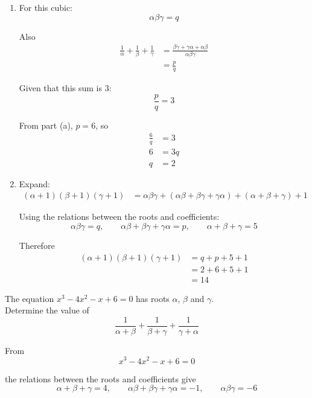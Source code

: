 \documentclass[leqno]{article}
\begin{document}
\begin{enumerate}[
  label=\textbf{\arabic*.},
  leftmargin=*,
  topsep=0pt,
  partopsep=0pt,
  parsep=0pt
]
\begin{djsSolution}
\begin{enumerate}[label=\textbf{(\alph*)}]
  \item For this cubic:
  \[
  \alpha\beta\gamma=q
  \]

  Also
  \begin{align*}
  \frac{1}{\alpha}+\frac{1}{\beta}+\frac{1}{\gamma}
  &=\frac{\beta\gamma+\gamma\alpha+\alpha\beta}{\alpha\beta\gamma} \\
  &=\frac{p}{q}
  \end{align*}

  Given that this sum is \(3\):
  \[
  \frac{p}{q}=3
  \]

  From part (a), $p=6$, so
  \begin{align*}
  \frac{6}{q}&=3 \\
  6&=3q \\
  q&=2
  \end{align*}

  \item Expand:
  \begin{align*}
  (\alpha+1)(\beta+1)(\gamma+1)
  &=\alpha\beta\gamma+(\alpha\beta+\beta\gamma+\gamma\alpha)+(\alpha+\beta+\gamma)+1
  \end{align*}

  Using the relations between the roots and coefficients:
  \[
  \alpha\beta\gamma=q,\qquad
  \alpha\beta+\beta\gamma+\gamma\alpha=p,\qquad
  \alpha+\beta+\gamma=5
  \]

  Therefore
  \begin{align*}
  (\alpha+1)(\beta+1)(\gamma+1)
  &=q+p+5+1 \\
  &=2+6+5+1 \\
  &=14
  \end{align*}
\end{enumerate}
\end{djsSolution}


\newpage

\questionitem

The equation $x^3 - 4x^2 - x + 6 = 0$ has roots $\alpha$, $\beta$ and $\gamma$. \\

Determine the value of \[\frac{1}{\alpha+\beta} + \frac{1}{\beta+\gamma} + \frac{1}{\gamma+\alpha}\] 

\vspace*{10pt}

\begin{djsSolution}
From
\[
x^3-4x^2-x+6=0
\]

the relations between the roots and coefficients give
\[
\alpha+\beta+\gamma=4,\qquad \alpha\beta+\beta\gamma+\gamma\alpha=-1,\qquad \alpha\beta\gamma=-6
\]


\end{djsSolution}
\end{enumerate}
\end{document}

